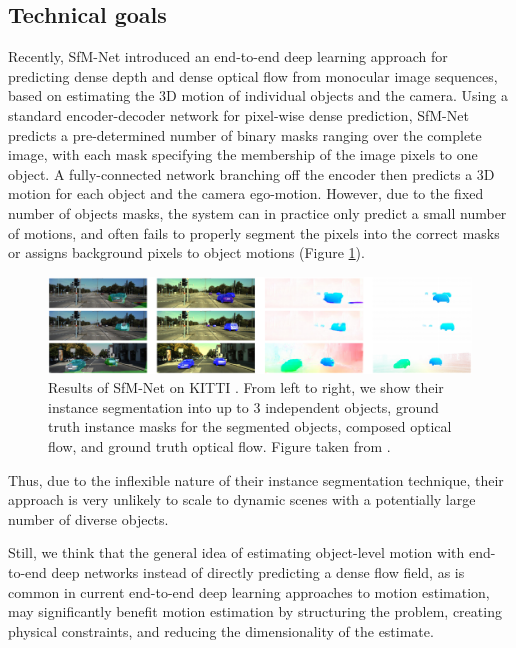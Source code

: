 \subsection{Technical goals}

Recently, SfM-Net \cite{SfmNet} introduced an end-to-end deep learning approach for predicting dense depth
and dense optical flow from monocular image sequences,
based on estimating the 3D motion of individual objects and the camera.
Using a standard encoder-decoder network for pixel-wise dense prediction,
SfM-Net predicts a pre-determined number of binary masks ranging over the complete image,
with each mask specifying the membership of the image pixels to one object.
A fully-connected network branching off the encoder then predicts a 3D motion for each object
and the camera ego-motion.
However, due to the fixed number of objects masks, the system can in practice only predict a small number of motions, and
often fails to properly segment the pixels into the correct masks or assigns background pixels to object motions (Figure \ref{figure:sfmnet_kitti}).
\begin{figure}[t]
  \centering
  \includegraphics[width=\textwidth]{figures/sfmnet_kitti}
\caption{
Results of SfM-Net \cite{SfmNet} on KITTI \cite{KITTI2015}.
From left to right, we show their instance segmentation into up to 3 independent objects,
ground truth instance masks for the segmented objects, composed optical flow,
and ground truth optical flow.
Figure taken from \cite{SfmNet}.
}
\label{figure:sfmnet_kitti}
\end{figure}
Thus, due to the inflexible nature of their instance segmentation technique,
their approach is very unlikely to scale to dynamic scenes with a potentially
large number of diverse objects.

Still, we think that the general idea of estimating object-level motion with
end-to-end deep networks instead
of directly predicting a dense flow field, as is common in current end-to-end
deep learning approaches to motion estimation, may significantly benefit motion
estimation by structuring the problem, creating physical constraints, and reducing
the dimensionality of the estimate.

